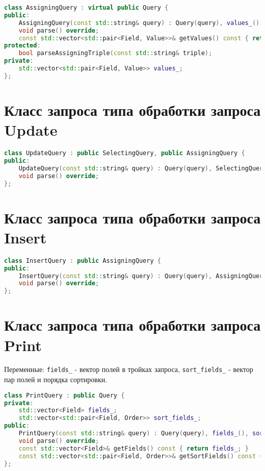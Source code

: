 \documentclass{article}
\begin{document}
\begin{lstlisting}[language=C++]
class AssigningQuery : virtual public Query {
public:
    AssigningQuery(const std::string& query) : Query(query), values_() {}
    void parse() override;
    const std::vector<std::pair<Field, Value>>& getValues() const { return values_; }
protected:
    bool parseAssigningTriple(const std::string& triple);
private:
    std::vector<std::pair<Field, Value>> values_;
};
\end{lstlisting}

\section*{Класс запроса типа обработки запроса Update}

\begin{lstlisting}[language=C++]
class UpdateQuery : public SelectingQuery, public AssigningQuery {
public:
    UpdateQuery(const std::string& query) : Query(query), SelectingQuery(query), AssigningQuery(query) {}
    void parse() override;
};
\end{lstlisting}

\section*{Класс запроса типа обработки запроса Insert}

\begin{lstlisting}[language=C++]
class InsertQuery : public AssigningQuery {
public:
    InsertQuery(const std::string& query) : Query(query), AssigningQuery(query) {}
    void parse() override;
};
\end{lstlisting}

\section*{Класс запроса типа обработки запроса Print}

Переменные: \texttt{fields\_} - вектор полей в тройках запроса, \texttt{sort\_fields\_} - вектор пар полей и порядка сортировки.

\begin{lstlisting}[language=C++]
class PrintQuery : public Query {
private:
    std::vector<Field> fields_;
    std::vector<std::pair<Field, Order>> sort_fields_;
public:
    PrintQuery(const std::string& query) : Query(query), fields_(), sort_fields_() {}
    void parse() override;
    const std::vector<Field>& getFields() const { return fields_; }
    const std::vector<std::pair<Field, Order>>& getSortFields() const { return sort_fields_; }
};
\end{lstlisting}
\end{document}
